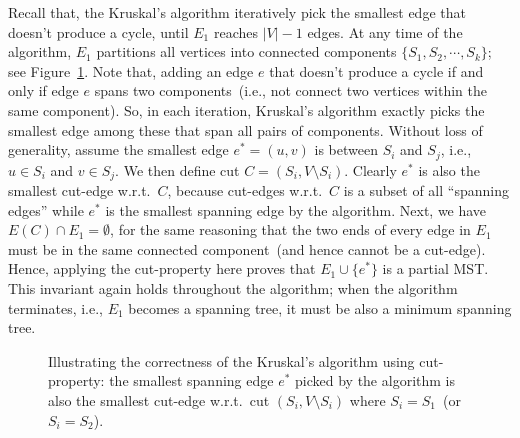 Recall that, the Kruskal's algorithm iteratively pick the smallest edge that doesn't produce a cycle,
until $E_1$ reaches $|V| - 1$ edges. At any time of the algorithm,
$E_1$ partitions all vertices into connected components $\{S_1, S_2, \cdots, S_k\}$; see Figure~\ref{fig:kruskal}.
Note that, adding an edge $e$ that doesn't produce a cycle if and only if edge $e$ spans two components~(i.e., not connect two vertices within the same component).
So, in each iteration, Kruskal's algorithm exactly picks the smallest edge among these that span all pairs of
components. Without loss of generality, assume the smallest edge $e^* = (u,v)$ is between $S_i$ and $S_j$, i.e., $u\in S_i$ and $v\in S_j$.
We then define cut $C = (S_i, V\setminus S_i)$. Clearly $e^*$ is also the smallest cut-edge w.r.t.\ $C$,
because cut-edges w.r.t.\ $C$ is a subset of all ``spanning edges'' while $e^*$ is the smallest spanning edge by the algorithm.
Next, we have $E(C)\cap E_1 = \emptyset$, for the same reasoning that the two ends of every edge in $E_1$ must be in the same connected component~(and hence cannot be a cut-edge).
Hence, applying the cut-property here proves that $E_1\cup \{e^*\}$ is a partial MST.
This invariant again holds throughout the algorithm; when the algorithm terminates, i.e., $E_1$ becomes a spanning tree,
it must be also a minimum spanning tree.

\begin{figure}[h]
\centering{}
\caption{Illustrating the correctness of the Kruskal's algorithm using cut-property:
the smallest spanning edge $e^*$ picked by the algorithm is also the smallest cut-edge
	w.r.t.\ cut $(S_i,V\setminus S_i)$ where $S_i = S_1$~(or $S_i = S_2$).  }
\label{fig:kruskal}
\end{figure}

